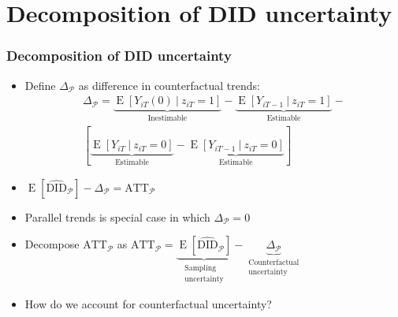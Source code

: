 \documentclass[table, xcolor={dvipsnames}, 9pt]{beamer}
\newcommand\given[1][]{\:#1\vert\:}
\theoremstyle{newstyle}
\DeclareMathOperator{\E}{\mathrm{E}}
\begin{document}
\section{Decomposition of DID uncertainty}
\begin{frame}
\frametitle{Decomposition of DID uncertainty}
\begin{itemize}
\item Define $\Delta_{\mathcal{P}}$ as difference in counterfactual trends: \pause 
\begin{align*}
\Delta_{\mathcal{P}} = \underbrace{\E\left[Y_{iT}(0) \given z_{iT} = 1\right]}_{\text{Inestimable}} - \underbrace{\E\left[Y_{iT-1} \given z_{iT} = 1\right]}_{\text{Estimable}} - \\ \left[\underbrace{\E\left[Y_{iT} \given z_{iT} = 0\right]}_{\text{Estimable}} - \underbrace{\E\left[Y_{iT-1} \given z_{iT} = 0\right]}_{\text{Estimable}}\right]
\end{align*} 
\item \pause $\E\left[\widehat{\text{DID}}_{\mathcal{P}}\right] - \Delta_{\mathcal{P}} = \text{ATT}_{\mathcal{P}}$
\item \pause Parallel trends is special case in which \normalsize $\Delta_{\mathcal{P}} = 0$ \large
\item \pause Decompose $\text{ATT}_{\mathcal{P}}$  as $\text{ATT}_{\mathcal{P}} = \underbrace{\E\left[\widehat{\text{DID}}_{\mathcal{P}}\right]}_{\substack{\text{Sampling} \\ \text{uncertainty}}} - \underbrace{\Delta_{\mathcal{P}}}_{\substack{\text{Counterfactual} \\ \text{uncertainty}}}$ 
\item \pause How do we account for counterfactual uncertainty?
\end{itemize}
\end{frame}
\end{document}
